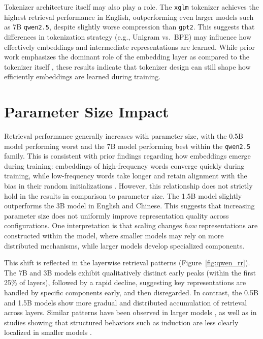 Tokenizer architecture itself may also play a role. The \texttt{xglm} tokenizer achieves the highest retrieval performance in English, outperforming even larger models such as 7B \texttt{qwen2.5}, despite slightly worse compression than \texttt{gpt2}. This suggests that differences in tokenization strategy (e.g., Unigram vs.\ BPE) may influence how effectively embeddings and intermediate representations are learned. While prior work emphasizes the dominant role of the embedding layer as compared to the tokenizer itself \citep{wu2023}, these results indicate that tokenizer design can still shape how efficiently embeddings are learned during training.

\section{Parameter Size Impact}\label{sec:discussion_qwen}

Retrieval performance generally increases with parameter size, with the 0.5B model performing worst and the 7B model performing best within the \texttt{qwen2.5} family. This is consistent with prior findings regarding how embeddings emerge during training: embeddings of high-frequency words converge quickly during training, while low-frequency words take longer and retain alignment with the bias in their random initializations \citep{papadimitriou2025}. However, this relationship does not strictly hold in the results in comparison to parameter size. The 1.5B model slightly outperforms the 3B model in English and Chinese. This suggests that increasing parameter size does not uniformly improve representation quality across configurations. One interpretation is that scaling changes \textit{how} representations are constructed within the model, where smaller models may rely on more distributed mechanisms, while larger models develop specialized components.

This shift is reflected in the layerwise retrieval patterns (Figure~\ref{fig:qwen_rr}). The 7B and 3B models exhibit qualitatively distinct early peaks (within the first 25\% of layers), followed by a rapid decline, suggesting key representations are handled by specific components early, and then disregarded. In contrast, the 0.5B and 1.5B models show more gradual and distributed accumulation of retrieval across layers. Similar patterns have been observed in larger models \citep{kaplan2025}, as well as in studies showing that structured behaviors such as induction are less clearly localized in smaller models \citep{feucht2025}.

